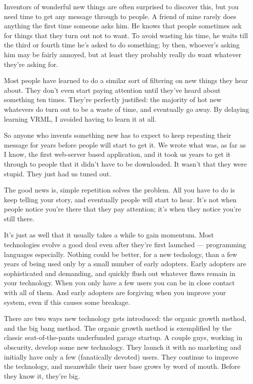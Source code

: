 Inventors of wonderful new things are often surprised to discover this,
but you need time to get any message through to people. A friend of mine
rarely does anything the first time someone asks him. He knows that
people sometimes ask for things that they turn out not to want. To avoid
wasting his time, he waits till the third or fourth time he's asked to
do something; by then, whoever's asking him may be fairly annoyed, but
at least they probably really do want whatever they're asking for.

Most people have learned to do a similar sort of filtering on new things
they hear about. They don't even start paying attention until they've
heard about something ten times. They're perfectly justified: the
majority of hot new whatevers do turn out to be a waste of time, and
eventually go away. By delaying learning VRML, I avoided having to learn
it at all.

So anyone who invents something new has to expect to keep repeating
their message for years before people will start to get it. We wrote
what was, as far as I know, the first web-server based application, and
it took us years to get it through to people that it didn't have to be
downloaded. It wasn't that they were stupid. They just had us tuned out.

The good news is, simple repetition solves the problem. All you have to
do is keep telling your story, and eventually people will start to hear.
It's not when people notice you're there that they pay attention; it's
when they notice you're still there.

It's just as well that it usually takes a while to gain momentum. Most
technologies evolve a good deal even after they're first launched ---
programming languages especially. Nothing could be better, for a new
techology, than a few years of being used only by a small number of
early adopters. Early adopters are sophisticated and demanding, and
quickly flush out whatever flaws remain in your technology. When you
only have a few users you can be in close contact with all of them. And
early adopters are forgiving when you improve your system, even if this
causes some breakage.

There are two ways new technology gets introduced: the organic growth
method, and the big bang method. The organic growth method is
exemplified by the classic seat-of-the-pants underfunded garage startup.
A couple guys, working in obscurity, develop some new technology. They
launch it with no marketing and initially have only a few (fanatically
devoted) users. They continue to improve the technology, and meanwhile
their user base grows by word of mouth. Before they know it, they're
big.

